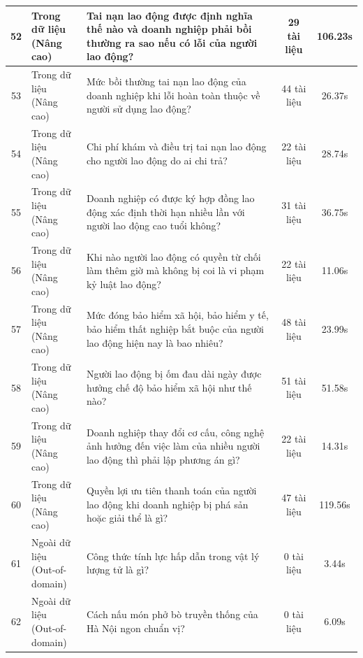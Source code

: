 \begin{longtable}{|c|l|p{6.5cm}|c|c|}
52 & \makecell[l]{Trong dữ liệu\\(Nâng cao)} & Tai nạn lao động được định nghĩa thế nào và doanh nghiệp phải bồi thường ra sao nếu có lỗi của người lao động? & 29 tài liệu & 106.23s \\ \hline
53 & \makecell[l]{Trong dữ liệu\\(Nâng cao)} & Mức bồi thường tai nạn lao động của doanh nghiệp khi lỗi hoàn toàn thuộc về người sử dụng lao động? & 44 tài liệu & 26.37s \\ \hline
54 & \makecell[l]{Trong dữ liệu\\(Nâng cao)} & Chi phí khám và điều trị tai nạn lao động cho người lao động do ai chi trả? & 22 tài liệu & 28.74s \\ \hline
55 & \makecell[l]{Trong dữ liệu\\(Nâng cao)} & Doanh nghiệp có được ký hợp đồng lao động xác định thời hạn nhiều lần với người lao động cao tuổi không? & 31 tài liệu & 36.75s \\ \hline
56 & \makecell[l]{Trong dữ liệu\\(Nâng cao)} & Khi nào người lao động có quyền từ chối làm thêm giờ mà không bị coi là vi phạm kỷ luật lao động? & 22 tài liệu & 11.06s \\ \hline
57 & \makecell[l]{Trong dữ liệu\\(Nâng cao)} & Mức đóng bảo hiểm xã hội, bảo hiểm y tế, bảo hiểm thất nghiệp bắt buộc của người lao động hiện nay là bao nhiêu? & 48 tài liệu & 23.99s \\ \hline
58 & \makecell[l]{Trong dữ liệu\\(Nâng cao)} & Người lao động bị ốm đau dài ngày được hưởng chế độ bảo hiểm xã hội như thế nào? & 51 tài liệu & 51.58s \\ \hline
59 & \makecell[l]{Trong dữ liệu\\(Nâng cao)} & Doanh nghiệp thay đổi cơ cấu, công nghệ ảnh hưởng đến việc làm của nhiều người lao động thì phải lập phương án gì? & 22 tài liệu & 14.31s \\ \hline
60 & \makecell[l]{Trong dữ liệu\\(Nâng cao)} & Quyền lợi ưu tiên thanh toán của người lao động khi doanh nghiệp bị phá sản hoặc giải thể là gì? & 47 tài liệu & 119.56s \\ \hline
61 & \makecell[l]{Ngoài dữ liệu\\(Out-of-domain)} & Công thức tính lực hấp dẫn trong vật lý lượng tử là gì? & 0 tài liệu & 3.44s \\ \hline
62 & \makecell[l]{Ngoài dữ liệu\\(Out-of-domain)} & Cách nấu món phở bò truyền thống của Hà Nội ngon chuẩn vị? & 0 tài liệu & 6.09s \\ \hline

\end{longtable}
